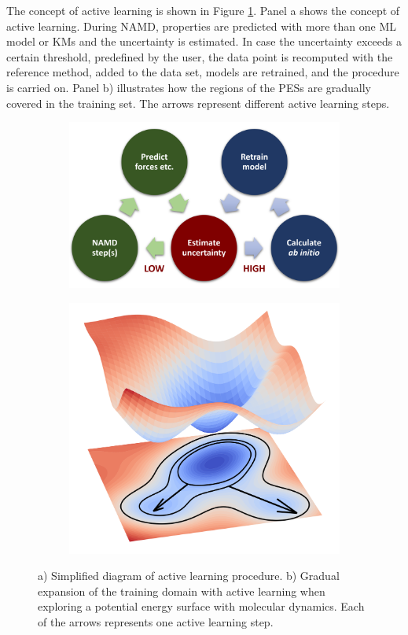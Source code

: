 \documentclass[9pt,bestpractices]{livecoms}
\begin{document}
The concept of active learning is shown in Figure \ref{fig:activelearning}. Panel a shows the concept of active learning. During NAMD, properties are predicted with more than one ML model or KMs and the uncertainty is estimated. In case the uncertainty exceeds a certain threshold, predefined by the user, the data point is recomputed with the reference method, added to the data set, models are retrained, and the procedure is carried on. Panel b) illustrates how the regions of the PESs are gradually covered in the training set. The arrows represent different active learning steps.

\begin{figure}[hbt!]
\begin{subfigure}{\linewidth}
\caption{}
\includegraphics[width=\linewidth]{figures/active_learning1.png}
\end{subfigure}
\begin{subfigure}{\linewidth}
\centering
\caption{}
\includegraphics[width=0.8\linewidth]{figures/active_learning2.png}
\end{subfigure}
\caption{a) Simplified diagram of active learning procedure. b) Gradual expansion of the training domain with active learning when exploring a potential energy surface with molecular dynamics. Each of the arrows represents one active learning step.}
\label{fig:activelearning}
\end{figure}
\end{document}
